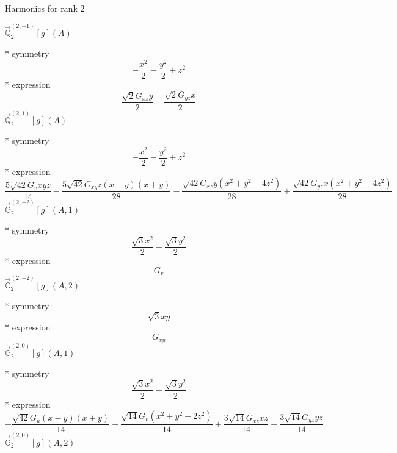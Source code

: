 \documentclass[fleqn,8pt]{jsarticle}
\begin{document}
\noindent * Harmonics for rank 2

\noindent\quad $\vec{\mathbb{Q}}_{2}^{(2,-1)}[g](A)$

\noindent\quad ** symmetry
\begin{dmath*}
- \frac{x^{2}}{2} - \frac{y^{2}}{2} + z^{2}
\end{dmath*}
\noindent\quad ** expression
\begin{dmath*}
\frac{\sqrt{2} G_{xz} y}{2} - \frac{\sqrt{2} G_{yz} x}{2}
\end{dmath*}
\noindent\quad $\vec{\mathbb{Q}}_{2}^{(2,1)}[g](A)$

\noindent\quad ** symmetry
\begin{dmath*}
- \frac{x^{2}}{2} - \frac{y^{2}}{2} + z^{2}
\end{dmath*}
\noindent\quad ** expression
\begin{dmath*}
\frac{5 \sqrt{42} G_{v} x y z}{14} - \frac{5 \sqrt{42} G_{xy} z \left(x - y\right) \left(x + y\right)}{28} - \frac{\sqrt{42} G_{xz} y \left(x^{2} + y^{2} - 4 z^{2}\right)}{28} + \frac{\sqrt{42} G_{yz} x \left(x^{2} + y^{2} - 4 z^{2}\right)}{28}
\end{dmath*}
\noindent\quad $\vec{\mathbb{G}}_{2}^{(2,-2)}[g](A,1)$

\noindent\quad ** symmetry
\begin{dmath*}
\frac{\sqrt{3} x^{2}}{2} - \frac{\sqrt{3} y^{2}}{2}
\end{dmath*}
\noindent\quad ** expression
\begin{dmath*}
G_{v}
\end{dmath*}
\noindent\quad $\vec{\mathbb{G}}_{2}^{(2,-2)}[g](A,2)$

\noindent\quad ** symmetry
\begin{dmath*}
\sqrt{3} x y
\end{dmath*}
\noindent\quad ** expression
\begin{dmath*}
G_{xy}
\end{dmath*}
\noindent\quad $\vec{\mathbb{G}}_{2}^{(2,0)}[g](A,1)$

\noindent\quad ** symmetry
\begin{dmath*}
\frac{\sqrt{3} x^{2}}{2} - \frac{\sqrt{3} y^{2}}{2}
\end{dmath*}
\noindent\quad ** expression
\begin{dmath*}
- \frac{\sqrt{42} G_{u} \left(x - y\right) \left(x + y\right)}{14} + \frac{\sqrt{14} G_{v} \left(x^{2} + y^{2} - 2 z^{2}\right)}{14} + \frac{3 \sqrt{14} G_{xz} x z}{14} - \frac{3 \sqrt{14} G_{yz} y z}{14}
\end{dmath*}
\noindent\quad $\vec{\mathbb{G}}_{2}^{(2,0)}[g](A,2)$
\end{document}

